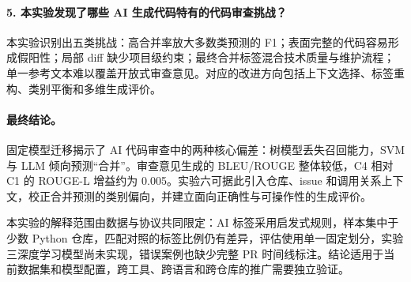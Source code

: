 \documentclass{experimentreport}
\begin{document}
{\paragraph{5. 本实验发现了哪些 AI 生成代码特有的代码审查挑战？}
本实验识别出五类挑战：高合并率放大多数类预测的 F1；表面完整的代码容易形成假阳性；局部 diff 缺少项目级约束；最终合并标签混合技术质量与维护流程；单一参考文本难以覆盖开放式审查意见。对应的改进方向包括上下文选择、标签重构、类别平衡和多维生成评价。

\paragraph{最终结论。}
固定模型迁移揭示了 AI 代码审查中的两种核心偏差：树模型丢失召回能力，SVM 与 LLM 倾向预测“合并”。审查意见生成的 BLEU/ROUGE 整体较低，C4 相对 C1 的 ROUGE-L 增益约为 0.005。实验六可据此引入仓库、issue 和调用关系上下文，校正合并预测的类别偏向，并建立面向正确性与可操作性的生成评价。

本实验的解释范围由数据与协议共同限定：AI 标签采用启发式规则，样本集中于少数 Python 仓库，匹配对照的标签比例仍有差异，评估使用单一固定划分，实验三深度学习模型尚未实现，错误案例也缺少完整 PR 时间线标注。结论适用于当前数据集和模型配置，跨工具、跨语言和跨仓库的推广需要独立验证。

}

\end{document}
